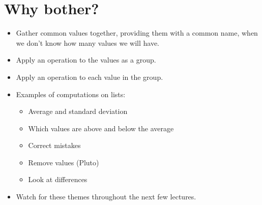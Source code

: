 \documentclass[letterpaper,10pt,english]{sphinxmanual}
\begin{document}
\section{Why bother?}
\label{\detokenize{lecture_notes/lec08_lists1:why-bother}}\begin{itemize}
\item {} 
Gather common values together, providing them with a common name,
 when we don’t know how many values we will have.

\item {} 
Apply an operation to the values as a group.

\item {} 
Apply an operation to each value in the group.

\item {} 
Examples of computations on lists:
\begin{itemize}
\item {} 
Average and standard deviation

\item {} 
Which values are above and below the average

\item {} 
Correct mistakes

\item {} 
Remove values (Pluto)

\item {} 
Look at differences

\end{itemize}

\item {} 
Watch for these themes throughout the next few lectures.

\end{itemize}
\end{document}

